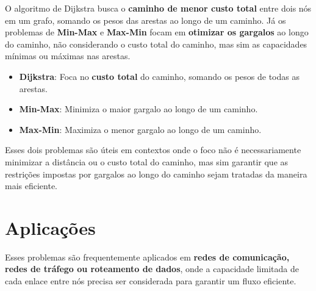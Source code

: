 \documentclass[12pt]{article}
\begin{document}
O algoritmo de Dijkstra busca o \textbf{caminho de menor custo total} entre dois nós em um grafo, somando os pesos das arestas ao longo de um caminho. Já os problemas de \textbf{Min-Max} e \textbf{Max-Min} focam em \textbf{otimizar os gargalos} ao longo do caminho, não considerando o custo total do caminho, mas sim as capacidades mínimas ou máximas nas arestas.

\begin{itemize}
    \item \textbf{Dijkstra}: Foca no \textbf{custo total} do caminho, somando os pesos de todas as arestas.
    \item \textbf{Min-Max}: Minimiza o maior gargalo ao longo de um caminho.
    \item \textbf{Max-Min}: Maximiza o menor gargalo ao longo de um caminho.
\end{itemize}

Esses dois problemas são úteis em contextos onde o foco não é necessariamente minimizar a distância ou o custo total do caminho, mas sim garantir que as restrições impostas por gargalos ao longo do caminho sejam tratadas da maneira mais eficiente.

\section{Aplicações}

Esses problemas são frequentemente aplicados em \textbf{redes de comunicação, redes de tráfego ou roteamento de dados}, onde a capacidade limitada de cada enlace entre nós precisa ser considerada para garantir um fluxo eficiente.
\end{document}
